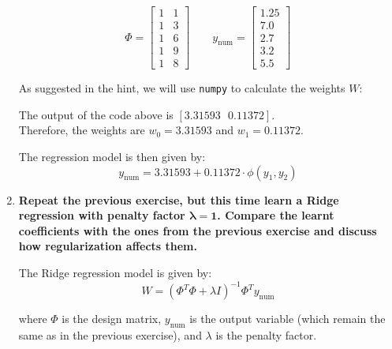 \documentclass[12pt]{article}
\begin{document}
\begin{enumerate}
    \begin{equation*}
        \Phi = \begin{bmatrix}
            1 & 1 \\
            1 & 3 \\
            1 & 6 \\
            1 & 9 \\
            1 & 8
        \end{bmatrix} \qquad
        y_\text{num} = \begin{bmatrix}
            1.25 \\
            7.0 \\
            2.7 \\
            3.2 \\
            5.5
        \end{bmatrix}
    \end{equation*}

    As suggested in the hint, we will use \texttt{numpy} to calculate the weights $W$:

    \vspace{10pt}
    

    \vspace{10pt}
    The output of the code above is $[3.31593\text{ }0.11372]$.\\ 
    Therefore, the weights are $w_0 = 3.31593$ and $w_1 = 0.11372$.

    \vspace{10pt}
    The regression model is then given by:
    \begin{equation*}
        y_\text{num} = 3.31593 + 0.11372 \cdot \phi(y_1, y_2)
    \end{equation*}

    \item \textbf{Repeat the previous exercise, but this time learn a Ridge regression with penalty
    factor $\mathbf{\lambda = 1}$. Compare the learnt coeﬃcients with the ones from the previous exercise and
    discuss how regularization aﬀects them.}

    \vspace{10pt}
    The Ridge regression model is given by:
    \begin{equation*}
        W = (\Phi^T \Phi + \lambda I)^{-1} \Phi^T y_\text{num}
    \end{equation*}
    
    where $\Phi$ is the design matrix, $y_\text{num}$ is the output variable (which remain the same as in the previous exercise), and $\lambda$ is the penalty factor.


\end{enumerate}
\end{document}
